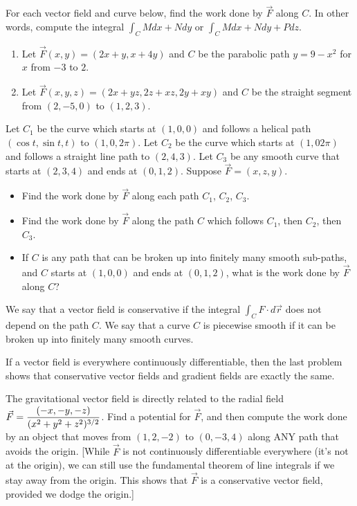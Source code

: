 \begin{problem}
%
For each vector field and curve below, find the work done by $\vec F$ along $C$. In other words, compute the integral $\int_C Mdx+Ndy$ or $\int_C Mdx+Ndy+Pdz$. 
\begin{enumerate}
 \item Let $\vec F(x,y) = (2x+y,x+4y)$ and $C$ be the parabolic path $y=9-x^2$ for $x$ from $-3$ to $2$. 
 \item Let $\vec F(x,y,z) = (2x+yz,2z+xz,2y+xy)$ and $C$ be the straight segment from $(2,-5,0)$ to $(1,2,3)$. 
\end{enumerate}
\end{problem}

\begin{problem}
 Let $C_1$ be the curve which starts at $(1,0,0)$ and follows a helical path $(\cos t, \sin t, t)$ to  $(1,0,2\pi)$. Let $C_2$ be the curve which starts at $(1,0 2\pi)$ and follows a straight line path to $(2,4,3)$. Let $C_3$ be any smooth curve that starts at $(2,3,4)$ and ends at $(0,1,2)$.  Suppose $\vec F = (x,z,y)$. 
 \begin{itemize}
  \item Find the work done by $\vec F$ along each path $C_1$, $C_2$, $C_3$.
  \item Find the work done by $\vec F$ along the path $C$ which follows $C_1$, then $C_2$, then $C_3$.  
  \item If $C$ is any path that can be broken up into finitely many smooth sub-paths, and $C$ starts at $(1,0,0)$ and ends at $(0,1,2)$, what is the work done by $\vec F$ along $C$?
 \end{itemize}
\end{problem}

\begin{definition}
 We say that a vector field is conservative if the integral $\int_C F\cdot d\vec r$ does not depend on the path $C$. We say that a curve $C$ is piecewise smooth if it can be broken up into finitely many smooth curves.
\end{definition}
 If a vector field is everywhere continuously differentiable, then the last problem shows that conservative vector fields and gradient fields are exactly the same.

\begin{problem}
 The gravitational vector field is directly related to the radial field $\displaystyle\vec F = \frac{\left(-x,-y,-z\right)}{(x^2+y^2+z^2)^{3/2}}$. Find a potential for $\vec F$, and then compute the work done by an object that moves from $(1,2,-2)$ to $(0,-3,4)$ along ANY path that avoids the origin. [While $\vec F$ is not continuously differentiable everywhere (it's not at the origin), we can still use the fundamental theorem of line integrals if we stay away from the origin. This shows that $\vec F$ is a conservative vector field, provided we dodge the origin.]
\end{problem}

